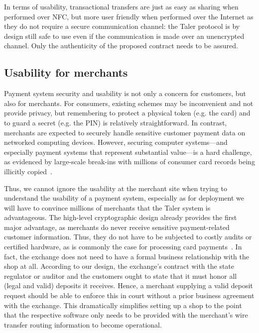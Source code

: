 \documentclass{IEEEtran}
\begin{document}
In terms of usability, transactional
transfers are just as easy as sharing when performed over NFC, but
more user friendly when performed over the Internet as they do not
require a secure communication channel: the Taler protocol is by
design still safe to use even if the communication is made over an
unencrypted channel. Only the authenticity of the proposed contract
needs to be assured.


\subsection{Usability for merchants}

Payment system security and usability is not only a concern for
customers, but also for merchants.  For consumers, existing schemes
may be inconvenient and not provide privacy, but remembering to
protect a physical token (e.g. the card) and to guard a secret
(e.g. the PIN) is relatively straightforward.  In contrast, merchants
are expected to securely handle sensitive customer payment data on
networked computing devices.  However, securing computer systems---and
especially payment systems that represent substantial value---is a
hard challenge, as evidenced by large-scale break-ins with millions of
consumer card records being illicitly copied~\cite{target}.

Thus, we cannot ignore the usability at the merchant site when trying
to understand the usability of a payment system, especially as for
deployment we will have to convince millions of merchants that the
Taler system is advantageous.  The high-level cryptographic design
already provides the first major advantage, as merchants do never
receive sensitive payment-related customer information.  Thus, they do
not have to be subjected to costly audits or certified hardware, as is
commonly the case for processing card payments~\cite{pcidss}. In fact,
the exchange does not need to have a formal business relationship with
the shop at all.  According to our design, the exchange's contract
with the state regulator or auditor and the customers ought to state
that it must honor all (legal and valid) deposits it receives.  Hence,
a merchant supplying a valid deposit request should be able to enforce
this in court without a prior business agreement with the exchange.
This dramatically simplifies setting up a shop to the point that the
respective software only needs to be provided with the merchant's wire
transfer routing information to become operational.
\end{document}
